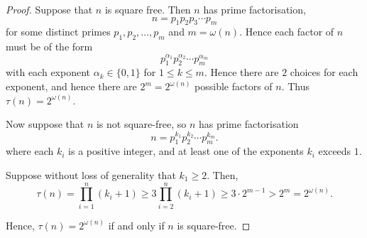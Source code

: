 \documentclass{unswmaths}
\begin{document}
\begin{proof}
    Suppose that $n$ is square free. Then $n$ has prime factorisation,
    \begin{equation*}
        n = p_1p_2p_3\cdots p_m
    \end{equation*}
    for some distinct primes $p_1,p_2,\ldots,p_m$ and $m = \omega(n)$. Hence each factor of $n$ must be of
    the form
    \begin{equation*}
        p_1^{\alpha_1}p_2^{\alpha_2}\cdots p_m^{\alpha_m}
    \end{equation*}
    with each exponent $\alpha_k \in \{0,1\}$ for $1\leq k \leq m$. Hence there
    are $2$ choices for each exponent, and hence there are $2^m = 2^{\omega(n)}$ possible
    factors of $n$. Thus $\tau(n) = 2^{\omega(n)}$.
    
    Now suppose that $n$ is not square-free, so $n$ has prime factorisation
    \begin{equation*}
        n = p_1^{k_1}p_2^{k_2}\cdots p_m^{k_m}.
    \end{equation*}
    where each $k_i$ is a positive integer, and at least one of the exponents $k_i$ exceeds $1$. 
    
    Suppose without loss of generality that $k_1 \geq 2$. Then,
    \begin{equation*}
        \tau(n) = \prod_{i=1}^n (k_i+1) \geq 3\prod_{i=2}^n (k_i+1) \geq 3\cdot 2^{m-1} > 2^m = 2^{\omega(n)}.
    \end{equation*}
    
    Hence, $\tau(n) = 2^{\omega(n)}$ if and only if $n$ is square-free.
    
\end{proof} 
\end{document}
